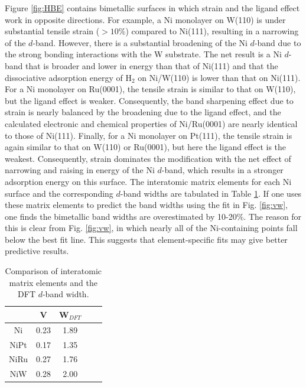 \documentclass[aps,prl,twocolumn,superscriptaddress,showkeys]{revtex4}
\begin{document}
Figure \ref{fig:HBE} contains bimetallic surfaces in which strain and
the ligand effect work in opposite directions. For example, a Ni
monolayer on W(110) is under substantial tensile strain ($>10\%$)
compared to Ni(111), resulting in a narrowing of the $d$-band. However,
there is a substantial broadening of the Ni $d$-band due to the strong
bonding interactions with the W substrate.  The net result is a Ni
$d$-band that is broader and lower in energy than that of Ni(111) and
that the dissociative adsorption energy of H$_2$ on Ni/W(110) is lower
than that on Ni(111). For a Ni monolayer on Ru(0001), the tensile
strain is similar to that on W(110), but the ligand effect is weaker.
Consequently, the band sharpening effect due to strain is nearly
balanced by the broadening due to the ligand effect, and the
calculated electronic and chemical properties of Ni/Ru(0001) are
nearly identical to those of Ni(111). Finally, for a Ni monolayer on
Pt(111), the tensile strain is again similar to that on W(110) or
Ru(0001), but here the ligand effect is the weakest.  Consequently,
strain dominates the modification with the net effect of narrowing and
raising in energy of the Ni $d$-band, which results in a stronger
adsorption energy on this surface. The interatomic matrix elements for
each Ni surface and the corresponding $d$-band widths are tabulated in
Table \ref{tab1}. If one uses these matrix elements to predict the
band widths using the fit in Fig. \ref{fig:vw}, one finds the
bimetallic band widths are overestimated by 10-20\%. The reason for
this is clear from Fig. \ref{fig:vw}, in which nearly all of the Ni-containing
points fall below the best fit line. This suggests that
element-specific fits may give better predictive results.

\begin{table}%
\caption{\label{tab1}Comparison of interatomic matrix elements and the
  DFT $d$-band width.}
\begin{ruledtabular}
\begin{tabular}{ccccc}
\hline
     &  V  &  W$_{DFT}$  \\\hline
Ni   & 0.23 & 1.89  \\\hline
NiPt & 0.17 & 1.35  \\\hline
NiRu & 0.27 & 1.76  \\\hline
NiW  & 0.28 & 2.00  \\\hline
\end{tabular}
\end{ruledtabular}
\end{table}
\end{document}
